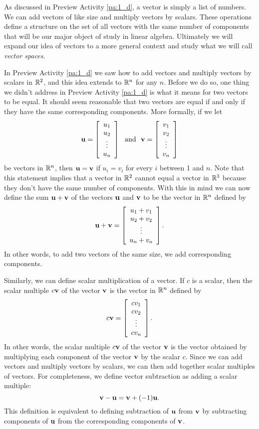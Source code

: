 \label{sec:vec_ops}

As discussed in Preview Activity \ref{pa:1_d}, a vector is simply a list of numbers. We can add vectors of like size and multiply vectors by scalars. These operations define a structure on the set of all vectors with the same number of components that will be our major object of study in linear algebra. Ultimately we will expand our idea of vectors to a more general context and study what we will call \emph{vector spaces}.

In Preview Activity \ref{pa:1_d} we saw how to add vectors and multiply vectors by scalars in $\mathbb{R}^2$, and this idea extends to $\mathbb{R}^n$ for any $n$. Before we do so, one thing we didn't address in Preview Activity \ref{pa:1_d}  is what it means for two vectors to be equal. It should seem reasonable that two vectors are equal if and only if they have the same corresponding components. More formally, if we let  
\[\mathbf{u} = \left[ \begin{array}{c} u_1 \\ u_2 \\ \vdots \\ u_n \end{array} \right] \ \text{ and } \ \mathbf{v} = \left[ \begin{array}{c} v_1 \\ v_2 \\ \vdots \\ v_n \end{array} \right]\]
be vectors in $\mathbb{R}^n$, then $\mathbf{u} = \mathbf{v}$ if $u_i = v_i$ for every $i$ between 1 and $n$. Note that this statement implies that a vector in $\mathbb{R}^2$ cannot equal a vector in $\mathbb{R}^3$ because they don't have the same number of components. With this in mind we can now define the sum $\mathbf{u} + \mathbf{v}$ of the vectors $\mathbf{u}$ and $\mathbf{v}$ to be the vector in $\mathbb{R}^n$ defined by
\[\mathbf{u} + \mathbf{v} = \left[ \begin{array}{c} u_1+v_1 \\ u_2+v_2 \\ \vdots \\ u_n+v_n \end{array} \right].\]
In other words, to add two vectors of the same size, we add corresponding components.

Similarly, we can define scalar multiplication of a vector. If $c$ is a scalar, then the scalar multiple $c \mathbf{v}$ of the vector $\mathbf{v}$ is the vector in $\mathbb{R}^n$ defined by
\[c\mathbf{v} = \left[ \begin{array}{c} cv_1 \\ cv_2 \\ \vdots \\ cv_n \end{array} \right].\]
In other words, the scalar multiple $c\mathbf{v}$ of the vector $\mathbf{v}$ is the vector obtained by multiplying each component of the vector $\mathbf{v}$ by the scalar $c$. Since we can add vectors and multiply vectors by scalars, we can then add together scalar multiples of vectors. For completeness, we define vector subtraction as adding a scalar multiple:
\[\mathbf{v} - \mathbf{u} = \mathbf{v} + (-1)\mathbf{u}.\]
This definition is equivalent to defining subtraction of $\mathbf{u}$ from $\mathbf{v}$ by subtracting components of $\mathbf{u}$ from the corresponding components of $\mathbf{v}$. 



